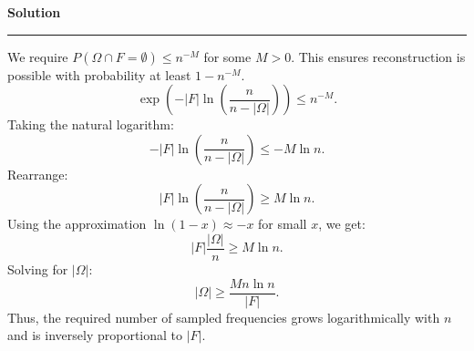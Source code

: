 \documentclass[a4paper,12pt]{article}
\newenvironment{solution}[2][]{%
    \begin{mdframed}[linecolor=blue!70!black, linewidth=2pt, roundcorner=10pt, backgroundcolor=yellow!10!white, skipabove=12pt, skipbelow=12pt]%
        \textbf{\large #2}
        \par\noindent\rule{\textwidth}{0.4pt}
}{
    \end{mdframed}
}
\begin{document}
\begin{solution}{Solution}
  We require $P(\Omega \cap F = \emptyset) \leq n^{-M}$ for some $M > 0$. This ensures reconstruction is possible with probability at least $1 - n^{-M}$.
  \begin{equation}
  \exp\left(-|F| \ln \left(\frac{n}{n - |\Omega|}\right)\right) \leq n^{-M}.
  \end{equation}
  Taking the natural logarithm:
  \begin{equation}
  -|F| \ln \left(\frac{n}{n - |\Omega|}\right) \leq -M \ln n.
  \end{equation}
  Rearrange:
  \begin{equation}
  |F| \ln \left(\frac{n}{n - |\Omega|}\right) \geq M \ln n.
  \end{equation}
  Using the approximation $\ln(1 - x) \approx -x$ for small $x$, we get:
  \begin{equation}
  |F| \frac{|\Omega|}{n} \geq M \ln n.
  \end{equation}
  Solving for $|\Omega|$:
  \begin{equation}
  |\Omega| \geq \frac{M n \ln n}{|F|}.
  \end{equation}
  Thus, the required number of sampled frequencies grows logarithmically with $n$ and is inversely proportional to $|F|$.
   

\end{solution}
\end{document}
